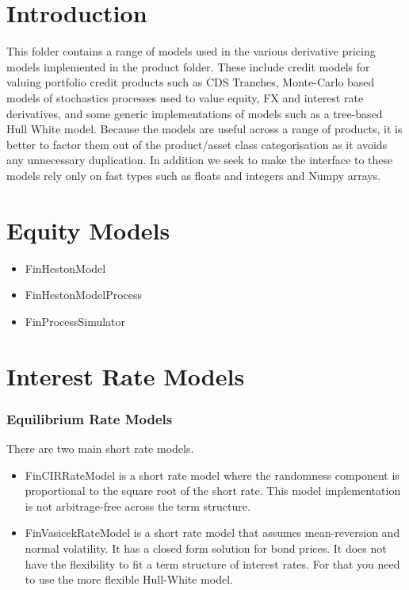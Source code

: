 \documentclass[twoside,11pt]{book}
\begin{document}
\section{Introduction}

This folder contains a range of models used in the various derivative pricing models implemented in the product folder. These include credit models for valuing portfolio credit products such as CDS Tranches, Monte-Carlo based models of stochastics processes used to value equity, FX and interest rate derivatives, and some generic implementations of models such as a tree-based Hull White model. Because the models are useful across a range of products, it is better to factor them out of the product/asset class categorisation as it avoids any unnecessary duplication. In addition we seek to make the interface to these models rely only on fast types such as floats and integers and Numpy arrays.


\section*{Equity Models}
\begin{itemize}
\item{ FinHestonModel 
}
\item{ FinHestonModelProcess
}
\item{ FinProcessSimulator
}
\end{itemize}


\section*{Interest Rate Models}

\subsubsection*{Equilibrium Rate Models}
There are two main short rate models.
\begin{itemize}
\item{ FinCIRRateModel is a short rate model where the randomness component is proportional to the square root of the short rate. This model implementation is not arbitrage-free across the term structure.
}
\item{ FinVasicekRateModel is a short rate model that assumes mean-reversion and normal volatility. It has a closed form solution for bond prices. It does not have the flexibility to fit a term structure of interest rates. For that you need to use the more flexible Hull-White model.
}
\end{itemize}
\end{document}
